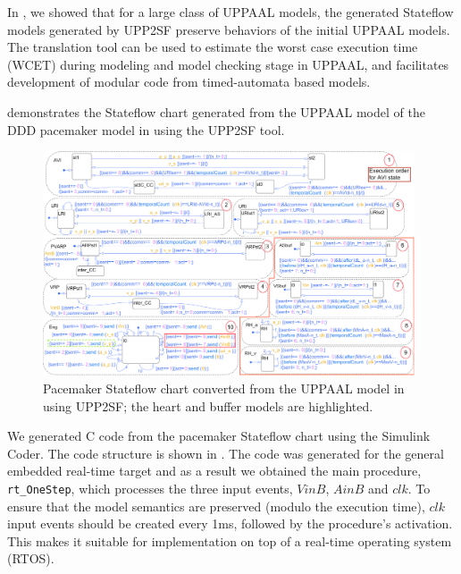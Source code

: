 In \cite{TECS}, we showed that for a large class of UPPAAL models, the generated Stateflow models generated by UPP2SF preserve behaviors of the initial UPPAAL models. The translation tool can be used to estimate the worst case execution time (WCET) during modeling and model checking stage in UPPAAL, and facilitates development of modular code from timed-automata based models. 


 demonstrates the Stateflow chart generated from the UPPAAL model of the DDD pacemaker model in  using the UPP2SF tool.
\begin{figure} [!t]
\center
\includegraphics[width=0.98\textwidth]{figs/PM_SF_buffer_newC1.png} 
\caption{Pacemaker Stateflow chart converted from the UPPAAL model in~ using UPP2SF; the heart and buffer models are highlighted.} 
\label{fig:PM_sf}
\end{figure}
We generated C code from the pacemaker Stateflow chart using the Simulink Coder. The code structure is shown in .
The code was generated for the general embedded real-time target and as a result we obtained the main procedure, \texttt{rt\_OneStep}, which processes the three input events, $VinB$, $AinB$ and $clk$. To ensure that the model semantics are preserved (modulo the execution time), $clk$ input events should be created every 1ms, followed by the procedure's activation. This makes it suitable for implementation on top of a real-time operating system (RTOS).

